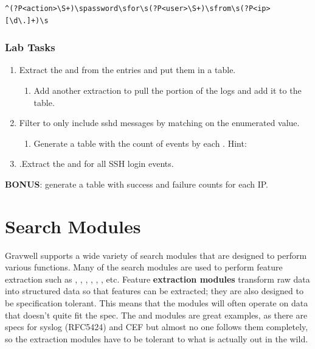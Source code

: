 \begin{Verbatim}[breaklines=true]
^(?P<action>\S+)\spassword\sfor\s(?P<user>\S+)\sfrom\s(?P<ip>[\d\.]+)\s
\end{Verbatim}

\subsubsection{Lab Tasks}

\begin{enumerate}
\item
  Extract the  and  from the entries and put them in a
  table.
	\begin{enumerate}
	\item
	  Add another extraction to pull the  portion of the logs and
	  add it to the table.
	\end{enumerate}
\item
  Filter to only include sshd messages by matching on the  enumerated value.
	\begin{enumerate}
	\item
	  Generate a table with the count of  events by each . Hint: 
	\end{enumerate}
\item
  .Extract the  and  for all SSH login events.
\end{enumerate}

\textbf{BONUS}: generate a table with success and failure counts for each IP.



\section{Search Modules}
Gravwell supports a wide variety of search modules that are designed to
perform various functions. Many of the search modules are used to
perform feature extraction such as , , ,
, , , etc. Feature \textbf{extraction modules}
transform raw data into structured data so that features can be
extracted; they are also designed to be specification tolerant. This
means that the modules will often operate on data that doesn't quite fit
the spec. The  and  modules are great examples, as there
are specs for syslog (RFC5424) and CEF but almost no one follows them
completely, so the extraction modules have to be tolerant to what is
actually out in the wild.


